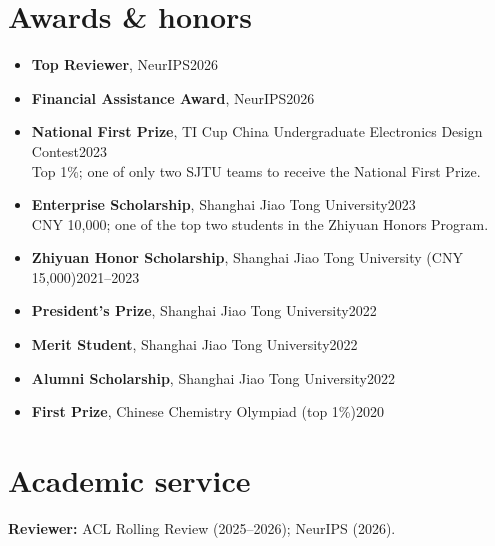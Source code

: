 \documentclass[11pt,letterpaper]{article}
\begin{document}
\section{Awards \& honors}
\begin{itemize}
\item \textbf{Top Reviewer}, NeurIPS\hfill 2026
\item \textbf{Financial Assistance Award}, NeurIPS\hfill 2026
\item \textbf{National First Prize}, TI Cup China Undergraduate Electronics Design Contest\hfill 2023\\
{\small Top 1\%; one of only two SJTU teams to receive the National First Prize.}
\item \textbf{Enterprise Scholarship}, Shanghai Jiao Tong University\hfill 2023\\
{\small CNY 10,000; one of the top two students in the Zhiyuan Honors Program.}
\item \textbf{Zhiyuan Honor Scholarship}, Shanghai Jiao Tong University (CNY 15,000)\hfill 2021--2023
\item \textbf{President's Prize}, Shanghai Jiao Tong University\hfill 2022
\item \textbf{Merit Student}, Shanghai Jiao Tong University\hfill 2022
\item \textbf{Alumni Scholarship}, Shanghai Jiao Tong University\hfill 2022
\item \textbf{First Prize}, Chinese Chemistry Olympiad (top 1\%)\hfill 2020
\end{itemize}
\section{Academic service}
\textbf{Reviewer:} ACL Rolling Review (2025--2026); NeurIPS (2026).
\end{document}
